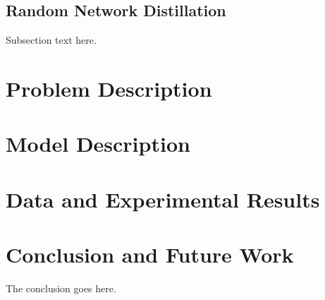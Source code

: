 \documentclass[11pt,journal,compsoc]{IEEEtran}
\begin{document}
	\subsection{Random Network Distillation}
	Subsection text here.
	
	\section{Problem Description}
	
	\section{Model Description}
	
	\section{Data and Experimental Results}
	
	
	
	
	
	
	\section{Conclusion and Future Work}
	The conclusion goes here. \cite{lstm}
	
	
	{}
	
	
	
	
	
	
	
	
	
	\ifCLASSOPTIONcaptionsoff
	\newpage
	\fi
	
	
	
\end{document}
